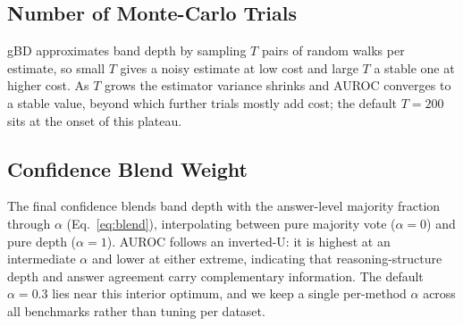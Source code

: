 \documentclass[letterpaper]{article} %
\begin{document}
\subsection{Number of Monte-Carlo Trials}
\label{sec:exp:ablation:trials}

gBD approximates band depth by sampling $T$ pairs of random walks per estimate, so
small $T$ gives a noisy estimate at low cost and large $T$ a stable one at higher
cost. As $T$ grows the estimator variance shrinks and AUROC converges to a stable
value, beyond which further trials mostly add cost; the default $T{=}200$ sits at
the onset of this plateau.

\subsection{Confidence Blend Weight}
\label{sec:exp:ablation:alpha}

The final confidence blends band depth with the answer-level majority fraction
through $\alpha$ (Eq.~\eqref{eq:blend}), interpolating between pure majority vote
($\alpha{=}0$) and pure depth ($\alpha{=}1$). AUROC follows an inverted-U: it is
highest at an intermediate $\alpha$ and lower at either extreme, indicating that
reasoning-structure depth and answer agreement carry complementary information. The
default $\alpha{=}0.3$ lies near this interior optimum, and we keep a single
per-method $\alpha$ across all benchmarks rather than tuning per dataset.


\end{document}
